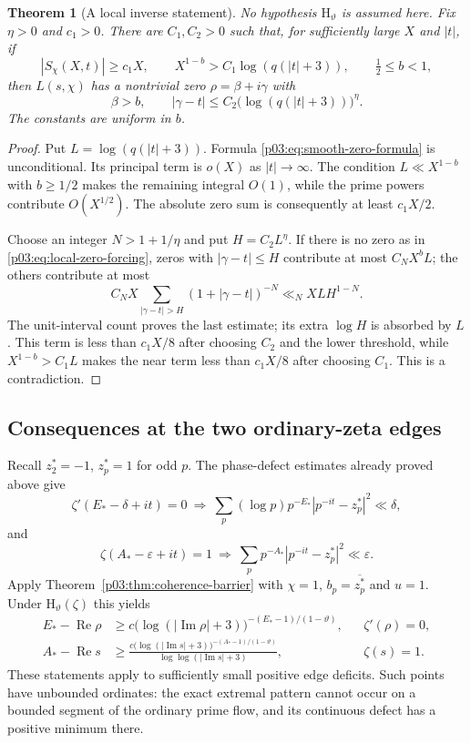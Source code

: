 \documentclass[11pt,letterpaper]{article}
\newtheorem{theorem}{Theorem}[section]
\theoremstyle{definition}
\theoremstyle{remark}
\newcommand{\eps}{\varepsilon}
\renewcommand{\Re}{\operatorname{Re}}
\renewcommand{\Im}{\operatorname{Im}}
\newcommand{\1}{\mathbf 1}
\begin{document}
\begin{theorem}[A local inverse statement]\label{p03:thm:local-zero-forcing}
No hypothesis $\mathrm H_\vartheta$ is assumed here. Fix $\eta>0$
and $c_1>0$. There are $C_1,C_2>0$ such that, for sufficiently large
$X$ and $|t|$, if
\[
 |S_\chi(X,t)|\ge c_1X,\qquad
 X^{1-b}>C_1\log(q(|t|+3)),\qquad \tfrac12\le b<1,
\]
then $L(s,\chi)$ has a nontrivial zero $\rho=\beta+i\gamma$ with
\begin{equation}\label{p03:eq:local-zero-forcing}
 \beta>b,\qquad
 |\gamma-t|\le C_2\bigl(\log(q(|t|+3))\bigr)^\eta.
\end{equation}
The constants are uniform in $b$.
\end{theorem}
\begin{proof}
Put $L=\log(q(|t|+3))$. Formula \eqref{p03:eq:smooth-zero-formula}
is unconditional. Its principal term is $o(X)$ as $|t|\to\infty$.
The condition $L\ll X^{1-b}$ with $b\ge1/2$ makes the remaining
integral $O(1)$, while the prime powers contribute $O(X^{1/2})$.
The absolute zero sum is consequently at least $c_1X/2$.

Choose an integer $N>1+1/\eta$ and put $H=C_2L^\eta$.
If there is no zero as in \eqref{p03:eq:local-zero-forcing}, zeros with
$|\gamma-t|\le H$ contribute at most $C_NX^bL$; the others contribute
at most
\[
 C_NX\sum_{|\gamma-t|>H}(1+|\gamma-t|)^{-N}
 \ll_N XLH^{1-N}.
\]
The unit-interval count proves the last estimate; its extra $\log H$
is absorbed by $L$. This term is less than $c_1X/8$ after choosing
$C_2$ and the lower threshold, while $X^{1-b}>C_1L$ makes the near
term less than $c_1X/8$ after choosing $C_1$. This is a contradiction.
\end{proof}

\subsection{Consequences at the two ordinary-zeta edges}

Recall $z_2^*=-1$, $z_p^*=1$ for odd $p$. The phase-defect estimates
already proved above give
\[
 \zeta'(E_*-\delta+it)=0\ \Longrightarrow\
 \sum_p(\log p)p^{-E_*}|p^{-it}-z_p^*|^2\ll\delta,
\]
and
\[
 \zeta(A_*-\eps+it)=1\ \Longrightarrow\
 \sum_pp^{-A_*}|p^{-it}-z_p^*|^2\ll\eps.
\]
Apply Theorem~\ref{p03:thm:coherence-barrier} with $\chi=1$,
$b_p=\overline{z_p^*}$ and $u=1$. Under
$\mathrm H_\vartheta(\zeta)$ this yields
\begin{align}
 E_*-\Re\rho&\ge
 c\bigl(\log(|\Im\rho|+3)\bigr)^{-(E_*-1)/(1-\vartheta)},
 &&\zeta'(\rho)=0,\label{p03:eq:zeta-critical-boundary}\\
 A_*-\Re s&\ge
 \frac{c\bigl(\log(|\Im s|+3)\bigr)^{-(A_*-1)/(1-\vartheta)}}
 {\log\log(|\Im s|+3)},
 &&\zeta(s)=1.\label{p03:eq:zeta-one-boundary}
\end{align}
These statements apply to sufficiently small positive edge deficits.
Such points have unbounded ordinates: the exact extremal pattern cannot
occur on a bounded segment of the ordinary prime flow, and its
continuous defect has a positive minimum there.
\end{document}
